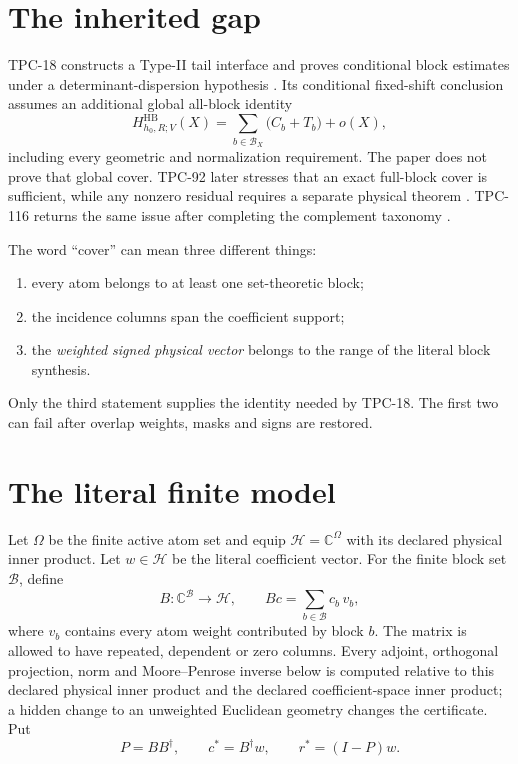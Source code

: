 \documentclass[11pt]{article}
\theoremstyle{definition}
\theoremstyle{remark}
\newcommand{\C}{\mathbb C}
\newcommand{\Block}{\mathcal B}
\begin{document}
\section{The inherited gap}

TPC-18 constructs a Type-II tail interface and proves conditional
block estimates under a determinant-dispersion hypothesis
\citep{WangTPC18}.  Its conditional fixed-shift conclusion assumes
an additional global all-block identity
\[
 H_{h_0,R;V}^{\mathrm{HB}}(X)
 =\sum_{b\in\Block_X}\bigl(C_b+T_b\bigr)+o(X),
\]
including every geometric and normalization requirement.  The paper
does not prove that global cover.  TPC-92 later stresses that an
exact full-block cover is sufficient, while any nonzero residual
requires a separate physical theorem \citep{WangTPC92}.  TPC-116
returns the same issue after completing the complement taxonomy
\citep{WangTPC116}.

The word ``cover'' can mean three different things:
\begin{enumerate}[leftmargin=2em]
\item every atom belongs to at least one set-theoretic block;
\item the incidence columns span the coefficient support;
\item the \emph{weighted signed physical vector} belongs to the
  range of the literal block synthesis.
\end{enumerate}
Only the third statement supplies the identity needed by TPC-18.
The first two can fail after overlap weights, masks and signs are
restored.

\section{The literal finite model}

Let \(\Omega\) be the finite active atom set and equip
\(\mathcal H=\C^\Omega\) with its declared physical inner product.
Let \(w\in\mathcal H\) be the literal coefficient vector.  For the
finite block set \(\Block\), define
\[
 B:\C^\Block\to\mathcal H,\qquad
 Bc=\sum_{b\in\Block}c_b\,v_b,
\]
where \(v_b\) contains every atom weight contributed by block \(b\).
The matrix is allowed to have repeated, dependent or zero columns.
Every adjoint, orthogonal projection, norm and Moore--Penrose inverse
below is computed relative to this declared physical inner product
and the declared coefficient-space inner product; a hidden change to
an unweighted Euclidean geometry changes the certificate.
Put
\[
 P=BB^\dagger,\qquad
 c^*=B^\dagger w,\qquad
 r^*=(I-P)w.
\]
\end{document}
